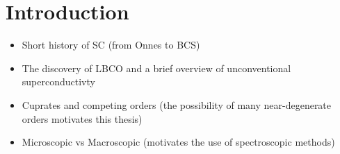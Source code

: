 \chapter{Introduction}

\begin{framed}
    \begin{itemize}
        \item Short history of SC (from Onnes to BCS)
        \item The discovery of LBCO and a brief overview of unconventional superconductivty
        \item Cuprates and competing orders (the possibility of many near-degenerate orders motivates this thesis)
        \item Microscopic vs Macroscopic (motivates the use of spectroscopic methods)
    \end{itemize}
\end{framed}

